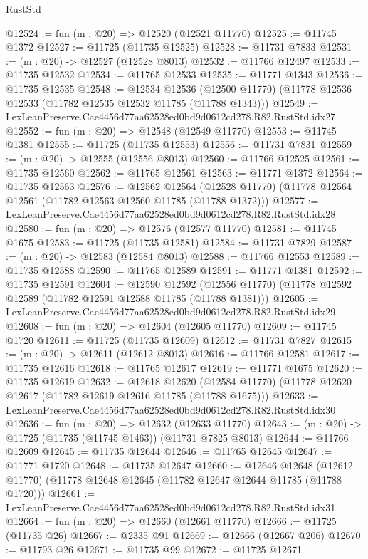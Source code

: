 \begin{lexlean}{RustStd}
\begin{coremodule}
@12524 := fun (m : @20) => @12520 (@12521 @11770)
@12525 := @11745 @1372
@12527 := @11725 (@11735 @12525)
@12528 := @11731 @7833
@12531 := (m : @20) -> @12527 (@12528 @8013)
@12532 := @11766 @12497
@12533 := @11735 @12532
@12534 := @11765 @12533
@12535 := @11771 @1343
@12536 := @11735 @12535
@12548 := @12534
    @12536
    (@12500 @11770)
    (@11778 @12536 @12533 (@11782 @12535 @12532 @11785 (@11788 @1343)))
@12549 := LexLeanPreserve.Cae4456d77aa62528ed0bd9d0612cd278.R82.RustStd.idx27
@12552 := fun (m : @20) => @12548 (@12549 @11770)
@12553 := @11745 @1381
@12555 := @11725 (@11735 @12553)
@12556 := @11731 @7831
@12559 := (m : @20) -> @12555 (@12556 @8013)
@12560 := @11766 @12525
@12561 := @11735 @12560
@12562 := @11765 @12561
@12563 := @11771 @1372
@12564 := @11735 @12563
@12576 := @12562
    @12564
    (@12528 @11770)
    (@11778 @12564 @12561 (@11782 @12563 @12560 @11785 (@11788 @1372)))
@12577 := LexLeanPreserve.Cae4456d77aa62528ed0bd9d0612cd278.R82.RustStd.idx28
@12580 := fun (m : @20) => @12576 (@12577 @11770)
@12581 := @11745 @1675
@12583 := @11725 (@11735 @12581)
@12584 := @11731 @7829
@12587 := (m : @20) -> @12583 (@12584 @8013)
@12588 := @11766 @12553
@12589 := @11735 @12588
@12590 := @11765 @12589
@12591 := @11771 @1381
@12592 := @11735 @12591
@12604 := @12590
    @12592
    (@12556 @11770)
    (@11778 @12592 @12589 (@11782 @12591 @12588 @11785 (@11788 @1381)))
@12605 := LexLeanPreserve.Cae4456d77aa62528ed0bd9d0612cd278.R82.RustStd.idx29
@12608 := fun (m : @20) => @12604 (@12605 @11770)
@12609 := @11745 @1720
@12611 := @11725 (@11735 @12609)
@12612 := @11731 @7827
@12615 := (m : @20) -> @12611 (@12612 @8013)
@12616 := @11766 @12581
@12617 := @11735 @12616
@12618 := @11765 @12617
@12619 := @11771 @1675
@12620 := @11735 @12619
@12632 := @12618
    @12620
    (@12584 @11770)
    (@11778 @12620 @12617 (@11782 @12619 @12616 @11785 (@11788 @1675)))
@12633 := LexLeanPreserve.Cae4456d77aa62528ed0bd9d0612cd278.R82.RustStd.idx30
@12636 := fun (m : @20) => @12632 (@12633 @11770)
@12643 := (m : @20) -> @11725 (@11735 (@11745 @1463)) (@11731 @7825 @8013)
@12644 := @11766 @12609
@12645 := @11735 @12644
@12646 := @11765 @12645
@12647 := @11771 @1720
@12648 := @11735 @12647
@12660 := @12646
    @12648
    (@12612 @11770)
    (@11778 @12648 @12645 (@11782 @12647 @12644 @11785 (@11788 @1720)))
@12661 := LexLeanPreserve.Cae4456d77aa62528ed0bd9d0612cd278.R82.RustStd.idx31
@12664 := fun (m : @20) => @12660 (@12661 @11770)
@12666 := @11725 (@11735 @26)
@12667 := @2335 @91
@12669 := @12666 (@12667 @206)
@12670 := @11793 @26
@12671 := @11735 @99
@12672 := @11725 @12671

\end{coremodule}
\end{lexlean}
